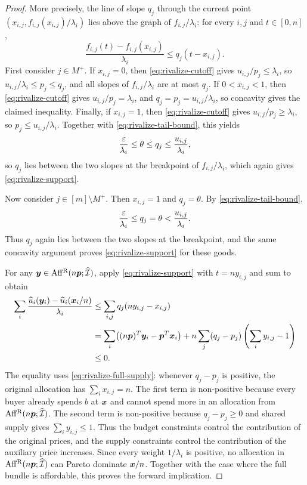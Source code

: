 \begin{proof}
More precisely, the line of slope $q_j$ through the current point
$(x_{i,j},f_{i,j}(x_{i,j})/\lambda_i)$ lies above the graph of $f_{i,j}/\lambda_i$:
for every $i,j$ and $t \in [0,n]$,
\begin{equation}
\label{eq:rivalize-support}
\frac{f_{i,j}(t)-f_{i,j}(x_{i,j})}{\lambda_i}
    \le q_j(t-x_{i,j}).
\end{equation}
First consider $j \in M^+$.
If $x_{i,j}=0$, then \cref{eq:rivalize-cutoff} gives $u_{i,j}/p_j \le \lambda_i$,
so $u_{i,j}/\lambda_i\le p_j\le q_j$,
and all slopes of $f_{i,j}/\lambda_i$ are at most $q_j$.
If $0<x_{i,j}<1$, then \cref{eq:rivalize-cutoff} gives $u_{i,j}/p_j=\lambda_i$,
and $q_j=p_j=u_{i,j}/\lambda_i$,
so concavity gives the claimed inequality.
Finally, if $x_{i,j}=1$, then \cref{eq:rivalize-cutoff} gives $u_{i,j}/p_j \ge \lambda_i$,
so $p_j \le u_{i,j}/\lambda_i$. Together with \cref{eq:rivalize-tail-bound}, this yields
\[ \frac{\varepsilon}{\lambda_i}\le\theta\le q_j
    \le\frac{u_{i,j}}{\lambda_i}, \]
so $q_j$ lies between the two slopes at the breakpoint of $f_{i,j}/\lambda_i$,
which again gives \cref{eq:rivalize-support}.

Now consider $j \in [m] \setminus M^+$. Then $x_{i,j}=1$ and $q_j=\theta$.
By \cref{eq:rivalize-tail-bound},
\[ \frac{\varepsilon}{\lambda_i}\le q_j=\theta<\frac{u_{i,j}}{\lambda_i}. \]
Thus $q_j$ again lies between the two slopes at the breakpoint,
and the same concavity argument proves \cref{eq:rivalize-support} for these goods.

For any $\bm{y} \in \operatorname{Aff^{\mathrm{R}}}(n\bm{p};\widehat{\mathcal{I}})$, apply \cref{eq:rivalize-support} with $t=ny_{i,j}$ and sum to obtain
\begin{align*}
\sum_i\frac{\widehat{u}_i(\bm{y}_i)-\widehat{u}_i(\bm{x}_i/n)}{\lambda_i}
&\le\sum_{i,j}q_j(ny_{i,j}-x_{i,j})\\
&=\sum_i\bigl((n\bm{p})^T\bm{y}_i-\bm{p}^T\bm{x}_i\bigr)
    +n\sum_j(q_j-p_j)\left(\sum_i y_{i,j}-1\right)\\
&\le0.
\end{align*}
The equality uses \cref{eq:rivalize-full-supply}: whenever $q_j-p_j$ is positive,
the original allocation has $\sum_i x_{i,j}=n$.
The first term is non-positive because every buyer already spends $b$ at $\bm{x}$
and cannot spend more in an allocation from $\operatorname{Aff^{\mathrm{R}}}(n\bm{p};\widehat{\mathcal{I}})$.
The second term is non-positive because $q_j-p_j\ge0$ and shared supply gives $\sum_i y_{i,j}\le1$.
Thus the budget constraints control the contribution of the original prices,
and the supply constraints control the contribution of the auxiliary price increases.
Since every weight $1/\lambda_i$ is positive, no allocation in $\operatorname{Aff^{\mathrm{R}}}(n\bm{p};\widehat{\mathcal{I}})$
can Pareto dominate $\bm{x}/n$.
Together with the case where the full bundle is affordable, this proves the forward implication.


\end{proof}
